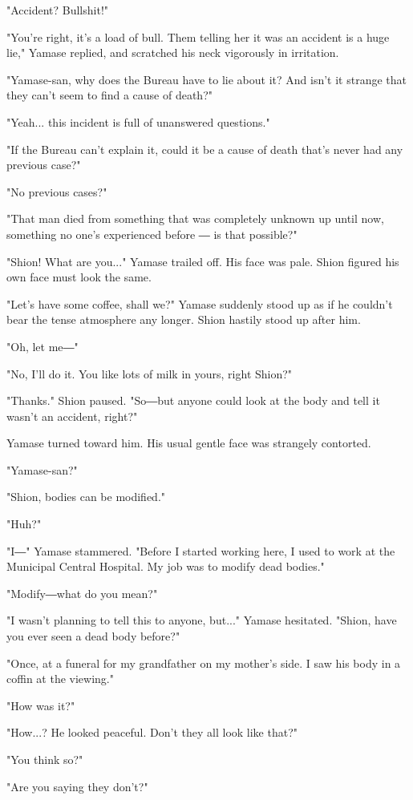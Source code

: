 "Accident? Bullshit!"

"You're right, it's a load of bull. Them telling her it was an accident
is a huge lie," Yamase replied, and scratched his neck vigorously in
irritation.

"Yamase-san, why does the Bureau have to lie about it? And isn't it
strange that they can't seem to find a cause of death?"

"Yeah... this incident is full of unanswered questions."

"If the Bureau can't explain it, could it be a cause of death that's
never had any previous case?"

"No previous cases?"

"That man died from something that was completely unknown up until now,
something no one's experienced before ― is that possible?"

"Shion! What are you..." Yamase trailed off. His face was pale. Shion
figured his own face must look the same.

"Let's have some coffee, shall we?" Yamase suddenly stood up as if he
couldn't bear the tense atmosphere any longer. Shion hastily stood up
after him.

"Oh, let me―"

"No, I'll do it. You like lots of milk in yours, right Shion?"

"Thanks." Shion paused. "So―but anyone could look at the body and tell
it wasn't an accident, right?"

Yamase turned toward him. His usual gentle face was strangely contorted.

"Yamase-san?"

"Shion, bodies can be modified."

"Huh?"

"I―" Yamase stammered. "Before I started working here, I used to work at
the Municipal Central Hospital. My job was to modify dead bodies."

"Modify―what do you mean?"

"I wasn't planning to tell this to anyone, but..." Yamase hesitated.
"Shion, have you ever seen a dead body before?"

"Once, at a funeral for my grandfather on my mother's side. I saw his
body in a coffin at the viewing."

"How was it?"

"How...? He looked peaceful. Don't they all look like that?"

"You think so?"

"Are you saying they don't?"

